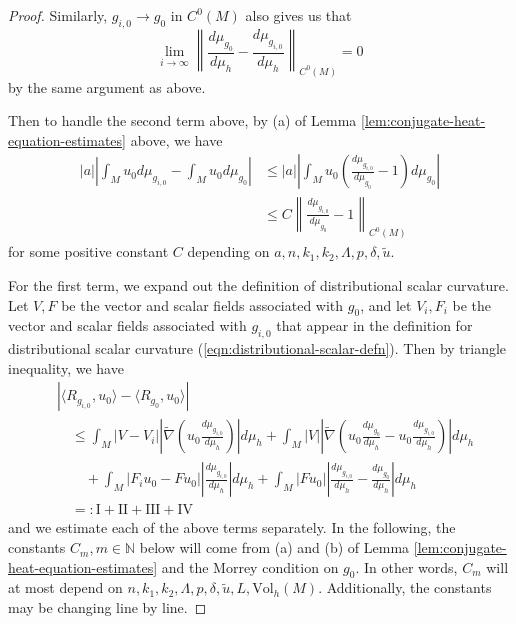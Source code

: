 \documentclass[12pt]{amsart}
\newcommand{\hdel}{\tilde{\nabla}}
\theoremstyle{remark}
\numberwithin{equation}{section}
\begin{document}
\begin{proof}
    Similarly, $g_{i,0} \to g_0$ in $C^0(M)$ also gives us that
    \begin{equation*}
        \lim\limits_{i\to\infty}\left\lVert \frac{d\mu_{g_0}}{d\mu_h} - \frac{d\mu_{g_{i,0}}}{d\mu_h}\right\rVert_{C^0(M)} = 0
    \end{equation*}
    by the same argument as above.

    Then to handle the second term above, by (a) of Lemma \ref{lem:conjugate-heat-equation-estimates} above, we have
    \begin{align*}
        |a|\left|\int_M u_0 d\mu_{g_{i,0}} - \int_M u_0 d\mu_{g_0}\right| &\leq |a|\left|\int_M u_0\left(\frac{d\mu_{g_{i,0}}}{d\mu_{g_0}} - 1\right)d\mu_{g_0}\right| \nonumber \\
        &\leq C\left\lVert \frac{d\mu_{g_{i,0}}}{d\mu_{g_0}} - 1\right\rVert_{C^0(M)}
    \end{align*}
    for some positive constant $C$ depending on $a, n, k_1, k_2, \Lambda, p, \delta, \tilde{u}$.

    For the first term, we expand out the definition of distributional scalar curvature. Let $V, F$ be the vector and scalar fields associated with $g_0$, and let $V_i, F_i$ be the vector and scalar fields associated with $g_{i,0}$ that appear in the definition for distributional scalar curvature (\ref{eqn:distributional-scalar-defn}). Then by triangle inequality, we have
    \begin{align*}
        &\left|\langle R_{g_{i,0}},u_0\rangle - \langle R_{g_0}, u_0\rangle\right| \nonumber \\
        &\quad \leq \int_M |V - V_i|\left|\hdel\left(u_0\frac{d\mu_{g_{i,0}}}{d\mu_h}\right)\right|d\mu_h + \int_M |V| \left|\hdel\left(u_0\frac{d\mu_{g_0}}{d\mu_h} - u_0\frac{d\mu_{g_{i,0}}}{d\mu_h}\right)\right|d\mu_h \nonumber \\
        &\qquad + \int_M |F_i u_0 - Fu_0|\left|\frac{d\mu_{g_{i,0}}}{d\mu_h}\right|d\mu_h + \int_M |Fu_0|\left|\frac{d\mu_{g_{i,0}}}{d\mu_h} - \frac{d\mu_{g_0}}{d\mu_h}\right|d\mu_h \nonumber \\
        &\quad =: \text{I} + \text{II} + \text{III} + \text{IV}
    \end{align*}
    and we estimate each of the above terms separately. In the following, the constants $C_m, m \in \mathbb{N}$ below will come from (a) and (b) of Lemma \ref{lem:conjugate-heat-equation-estimates} and the Morrey condition on $g_0$. In other words, $C_m$ will at most depend on $n, k_1, k_2, \Lambda, p, \delta, \tilde{u}, L, \text{Vol}_h(M)$. Additionally, the constants may be changing line by line.


\end{proof}
\end{document}
